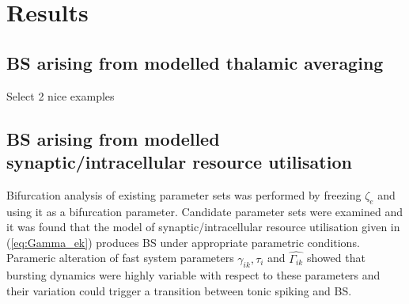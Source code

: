\documentclass[a4paper,12pt]{article}
\begin{document}
\section{Results}

\subsection{BS arising from modelled thalamic averaging}
Select 2 nice examples


\subsection{BS arising from modelled synaptic/intracellular resource utilisation}
Bifurcation analysis of existing parameter sets was performed by freezing $\zeta_e$ and using it as a bifurcation parameter. Candidate parameter sets were examined and it was found that the model of synaptic/intracellular resource utilisation given in (\ref{eq:Gamma_ek}) produces BS under appropriate parametric conditions. Parameric alteration of fast system parameters $\gamma_{ik}, \tau_i$ and $\hat{\Gamma_{ik}}$ showed that bursting dynamics were highly variable with respect to these parameters and their variation could trigger a transition between tonic spiking and BS.
\end{document}
